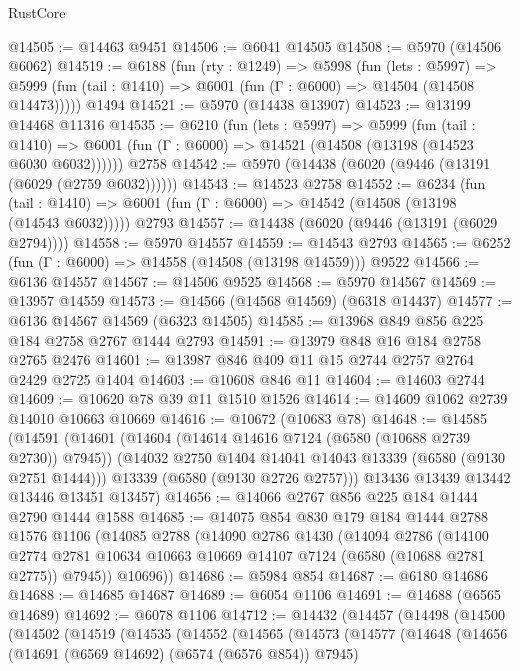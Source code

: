 \begin{lexlean}{RustCore}
\begin{coremodule}
{\begin{coremodule}
{{{{{{{{{{{{{{{{{{{{{{{{{{{{{{{{{{{{{{{{{{{{{@14505 := @14463 @9451
@14506 := @6041 @14505
@14508 := @5970 (@14506 @6062)
@14519 := @6188
    (fun (rty : @1249) =>
    @5998
      (fun (lets : @5997) =>
      @5999 (fun (tail : @1410) => @6001 (fun (Γ : @6000) => @14504 (@14508 @14473)))))
    @1494
@14521 := @5970 (@14438 @13907)
@14523 := @13199 @14468 @11316
@14535 := @6210
    (fun (lets : @5997) =>
    @5999
      (fun (tail : @1410) =>
      @6001 (fun (Γ : @6000) => @14521 (@14508 (@13198 (@14523 @6030 @6032))))))
    @2758
@14542 := @5970 (@14438 (@6020 (@9446 (@13191 (@6029 (@2759 @6032))))))
@14543 := @14523 @2758
@14552 := @6234
    (fun (tail : @1410) => @6001 (fun (Γ : @6000) => @14542 (@14508 (@13198 (@14543 @6032)))))
    @2793
@14557 := @14438 (@6020 (@9446 (@13191 (@6029 @2794))))
@14558 := @5970 @14557
@14559 := @14543 @2793
@14565 := @6252 (fun (Γ : @6000) => @14558 (@14508 (@13198 @14559))) @9522
@14566 := @6136 @14557
@14567 := @14506 @9525
@14568 := @5970 @14567
@14569 := @13957 @14559
@14573 := @14566 (@14568 @14569) (@6318 @14437)
@14577 := @6136 @14567 @14569 (@6323 @14505)
@14585 := @13968 @849 @856 @225 @184 @2758 @2767 @1444 @2793
@14591 := @13979 @848 @16 @184 @2758 @2765 @2476
@14601 := @13987 @846 @409 @11 @15 @2744 @2757 @2764 @2429 @2725 @1404
@14603 := @10608 @846 @11
@14604 := @14603 @2744
@14609 := @10620 @78 @39 @11 @1510 @1526
@14614 := @14609 @1062 @2739 @14010 @10663 @10669
@14616 := @10672 (@10683 @78)
@14648 := @14585
    (@14591
      (@14601
        (@14604 (@14614 @14616 @7124 (@6580 (@10688 @2739 @2730)) @7945))
        (@14032 @2750 @1404 @14041 @14043 @13339 (@6580 (@9130 @2751 @1444)))
        @13339
        (@6580 (@9130 @2726 @2757)))
      @13436
      @13439
      @13442
      @13446
      @13451
      @13457)
@14656 := @14066 @2767 @856 @225 @184 @1444 @2790 @1444 @1588
@14685 := @14075
    @854
    @830
    @179
    @184
    @1444
    @2788
    @1576
    @1106
    (@14085
      @2788
      (@14090
        @2786
        @1430
        (@14094
          @2786
          (@14100 @2774 @2781 @10634 @10663 @10669 @14107 @7124 (@6580 (@10688 @2781 @2775)) @7945))
        @10696))
@14686 := @5984 @854
@14687 := @6180 @14686
@14688 := @14685 @14687
@14689 := @6054 @1106
@14691 := @14688 (@6565 @14689)
@14692 := @6078 @1106
@14712 := @14432
    (@14457
      (@14498
        (@14500
          (@14502
            (@14519
              (@14535
                (@14552
                  (@14565
                    (@14573
                      (@14577
                        (@14648
                          (@14656
                            (@14691 (@6569 @14692) (@6574 (@6576 @854)) @7945)
}}}}}}}}}}}}}}}}}}}}}}}}}}}}}}}}}}}}}}}}}}}}}
\end{coremodule}}
\end{coremodule}
\end{lexlean}
